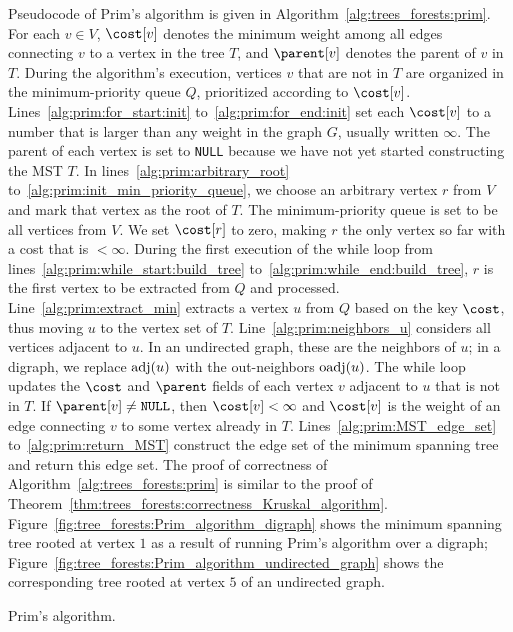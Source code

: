 Pseudocode of Prim's algorithm is given in
Algorithm~\ref{alg:trees_forests:prim}. For each $v \in V$, $\cost[v]$
denotes the minimum weight among all edges connecting $v$ to a vertex
in the tree $T$, and $\parent[v]$ denotes the parent of $v$ in
$T$. During the algorithm's execution, vertices $v$ that are not in
$T$ are organized in the minimum-priority queue $Q$, prioritized
according to $\cost[v]$. Lines~\ref{alg:prim:for_start:init}
to~\ref{alg:prim:for_end:init} set each $\cost[v]$ to a number that
is larger than any weight in the graph $G$, usually written $\infty$.
The parent of each vertex is set to \texttt{NULL} because we have not
yet started constructing the MST $T$. In
lines~\ref{alg:prim:arbitrary_root}
to~\ref{alg:prim:init_min_priority_queue}, we choose an arbitrary
vertex $r$ from $V$ and mark that vertex as the root of $T$. The
minimum-priority queue is set to be all vertices from $V$. We set
$\cost[r]$ to zero, making $r$ the only vertex so far with a cost that
is $< \infty$. During the first execution of the while loop from
lines~\ref{alg:prim:while_start:build_tree}
to~\ref{alg:prim:while_end:build_tree}, $r$ is the first vertex to be
extracted from $Q$ and processed. Line~\ref{alg:prim:extract_min}
extracts a vertex $u$ from $Q$ based on the key $\cost$, thus moving
$u$ to the vertex set of $T$. Line~\ref{alg:prim:neighbors_u}
considers all vertices adjacent to $u$. In an undirected graph, these
are the neighbors of $u$; in a digraph, we replace $\operatorname*{adj}(u)$ with the
out-neighbors $\operatorname*{oadj}(u)$. The while loop updates the $\cost$ and
$\parent$ fields of each vertex $v$ adjacent to $u$ that is not in
$T$. If $\parent[v] \neq \texttt{NULL}$, then $\cost[v] < \infty$ and
$\cost[v]$ is the weight of an edge connecting $v$ to some vertex
already in $T$. Lines~\ref{alg:prim:MST_edge_set}
to~\ref{alg:prim:return_MST} construct the edge set of the minimum
spanning tree and return this edge set. The proof of correctness of
Algorithm~\ref{alg:trees_forests:prim} is similar to the proof of
Theorem~\ref{thm:trees_forests:correctness_Kruskal_algorithm}.
Figure~\ref{fig:tree_forests:Prim_algorithm_digraph} shows the minimum
spanning tree rooted at vertex $1$ as a result of running Prim's
algorithm over a digraph;
Figure~\ref{fig:tree_forests:Prim_algorithm_undirected_graph} shows
the corresponding tree rooted at vertex $5$ of an undirected graph.

\begin{algorithm}[!htbp]

\caption{Prim's algorithm.}
\label{alg:trees_forests:prim}
\end{algorithm}

